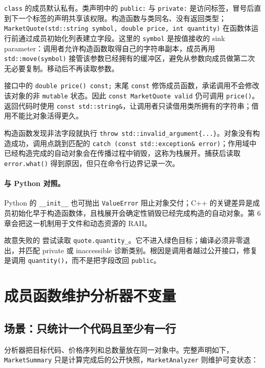 \texttt{class} 的成员默认私有。类声明中的 \texttt{public:} 与 \texttt{private:} 是访问标签，冒号后直到下一个标签的声明共享该权限。构造函数与类同名、没有返回类型；\texttt{MarketQuote(std::string symbol, double price, int quantity)} 在函数体运行前通过成员初始化列表建立字段。这里的 \texttt{symbol} 是按值接收的 sink parameter：调用者允许构造函数取得自己的字符串副本，成员再用 \texttt{std::move(symbol)} 接管该参数已经拥有的缓冲区，避免从参数向成员做第二次无必要复制。移动后不再读取参数。

接口中的 \texttt{double price() const;} 末尾 \texttt{const} 修饰成员函数，承诺调用不会修改该对象的非 \texttt{mutable} 状态。因此 \texttt{const MarketQuote valid} 仍可调用 \texttt{price()}。返回代码时使用 \texttt{const std::string\&}，让调用者只读借用类所拥有的字符串；借用不能比对象活得更久。

构造函数发现非法字段就执行 \texttt{throw std::invalid\_argument\{...\}}。对象没有构造成功，调用点跳到匹配的 \texttt{catch (const std::exception\& error)}；作用域中已经构造完成的自动对象会在传播过程中销毁，这称为栈展开。捕获后读取 \texttt{error.what()} 得到原因，但只在命令行边界记录一次。

\paragraph{与 Python 对照。}
Python 的 \texttt{\_\_init\_\_} 也可抛出 \texttt{ValueError} 阻止对象交付；C++ 的关键差异是成员初始化早于构造函数体，且栈展开会确定性销毁已经完成构造的自动对象。第 6 章会把这一机制用于文件和动态资源的 RAII。

故意失败的  尝试读取 \texttt{quote.quantity\_}。它不进入绿色目标；编译必须非零退出，并匹配 private 或 inaccessible 诊断类别。根因是调用者越过公开接口，修复是调用 \texttt{quantity()}，而不是把字段改回 \texttt{public}。

\section{成员函数维护分析器不变量}

\subsection{场景：只统计一个代码且至少有一行}

分析器把目标代码、价格序列和总数量放在同一对象中。完整声明如下，\texttt{MarketSummary} 只是计算完成后的公开快照，\texttt{MarketAnalyzer} 则维护可变状态：

